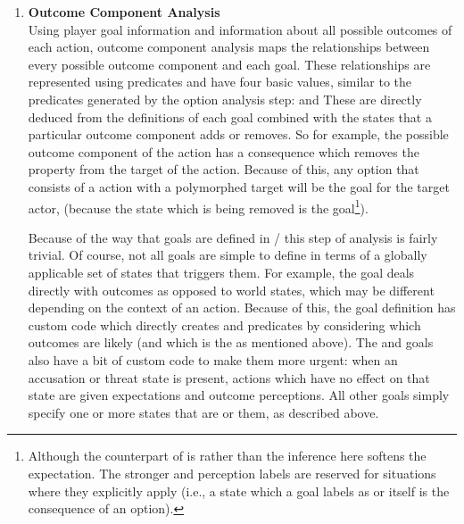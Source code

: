 \begin{enumerate}[leftmargin=1.4em]
\item %
\textbf{Outcome Component Analysis} \\
%
Using player goal information and information about all possible outcomes of each action, outcome component analysis maps the relationships between every possible outcome component and each goal.
%
These relationships are represented using  predicates and have four basic  values, similar to the  predicates generated by the option analysis step:    and 
%
These are directly deduced from the definitions of each goal combined with the states that a particular outcome component adds or removes.
%
So for example, the  possible outcome component of the  action has a consequence which removes the  property from the target of the action.
%
Because of this, any option that consists of a  action with a polymorphed target will be  the  goal for the target actor, (because the  state which is being removed is  the  goal\footnote{%
Although the counterpart of  is  rather than  the inference here softens the expectation.
%
The stronger  and  perception labels are reserved for situations where they explicitly apply (i.e., a state which a goal labels as  or  itself is the consequence of an option).%
}).


Because of the way that goals are defined in \dunyazad/ this step of analysis is fairly trivial.
%
Of course, not all goals are simple to define in terms of a globally applicable set of states that triggers them.
%
For example, the  goal deals directly with outcomes as opposed to world states, which may be different depending on the context of an action.
%
Because of this, the  goal definition has custom code which directly creates  and  predicates by considering which outcomes are likely (and which is the  as mentioned above).
%
The  and  goals also have a bit of custom code to make them more urgent: when an accusation or threat state is present, actions which have no effect on that state are given  expectations and  outcome perceptions.
%
All other goals simply specify one or more states that are    or  them, as described above.



\end{enumerate}

